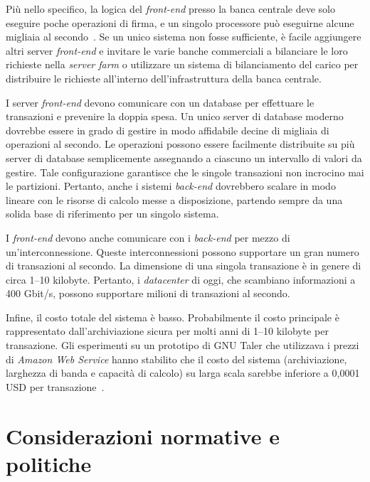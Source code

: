 \documentclass[a4paper]{article}
\begin{document}
Più nello specifico, la logica del \textit{front-end} presso la banca
centrale deve solo eseguire poche operazioni di firma, e un singolo
processore può eseguirne alcune migliaia al secondo~\cite[vedi][]{Bernstein2020}.
Se un unico sistema non fosse sufficiente, è facile aggiungere altri
server \textit{front-end} e invitare le varie banche commerciali a
bilanciare le loro richieste nella \textit{server farm} o
utilizzare un sistema di bilanciamento del carico per distribuire le
richieste all'interno dell'infrastruttura della banca centrale.

I server \textit{front-end} devono comunicare con un database per
effettuare le transazioni e prevenire la doppia spesa. Un unico server
di database moderno dovrebbe essere in grado di gestire in modo
affidabile decine di migliaia di operazioni al secondo. Le operazioni
possono essere facilmente distribuite su più server di database
semplicemente assegnando a ciascuno un intervallo di valori da
gestire. Tale configurazione garantisce che le singole transazioni non
incrocino mai le partizioni. Pertanto, anche i sistemi \textit{back-end}
dovrebbero scalare in modo lineare con le risorse di calcolo messe a
disposizione, partendo sempre da una solida base di riferimento per un
singolo sistema.

I \textit{front-end} devono anche comunicare con i \textit{back-end} per
mezzo di un'interconnessione. Queste interconnessioni possono
supportare un gran numero di transazioni al secondo. La dimensione di
una singola transazione è in genere di circa 1–10 kilobyte. Pertanto,
i \textit{datacenter} di oggi, che scambiano informazioni a 400 Gbit/s,
possono supportare milioni di transazioni al secondo.

%
Infine, il costo totale del sistema è basso. Probabilmente il costo
principale è rappresentato dall'archiviazione sicura per
molti anni di 1–10 kilobyte per transazione. Gli esperimenti su un
prototipo di GNU Taler che utilizzava i prezzi di \textit{Amazon Web Service}
hanno stabilito che il costo del sistema (archiviazione, larghezza di
banda e capacità di calcolo) su larga scala sarebbe inferiore a 
0,0001 USD per transazione~\cite[per i dettagli sui dati, si veda][]{Dold}.

\section{Considerazioni normative e politiche}
    \label{5.-considerazioni-normative-e-politiche}
\end{document}
